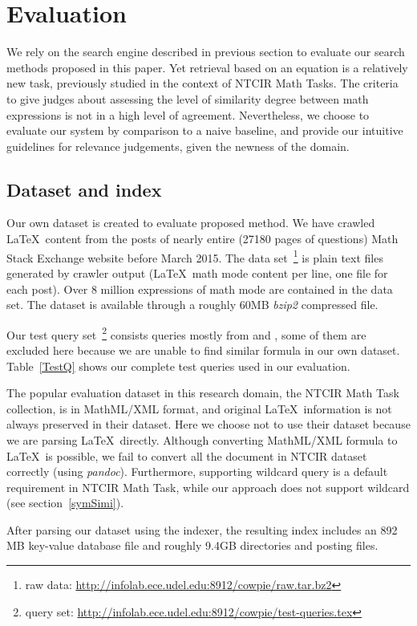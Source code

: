 \section{Evaluation}
We rely on the search engine described in previous section to evaluate our search methods proposed in this paper.
Yet retrieval based on an equation is a relatively new task, previously studied in the context of NTCIR Math Tasks. 
The criteria to give judges about assessing the level of similarity degree between math expressions is not in a high level of agreement.
Nevertheless, we choose to evaluate our system by comparison to a naive baseline, and provide our intuitive guidelines for relevance judgements, given the newness of the domain.

\subsection{Dataset and index}
\label{datasetAndIndex}
Our own dataset is created to evaluate proposed method.
We have crawled \LaTeX\ content from the posts of nearly entire (27180 pages of questions) Math Stack Exchange website before March 2015. 
The data set~\footnote{raw data: \url{http://infolab.ece.udel.edu:8912/cowpie/raw.tar.bz2} }
is plain text files generated by crawler output (\LaTeX\ math mode content per line, one file for each post).  
Over 8 million expressions of math mode are contained in the data set. 
The dataset is available through a roughly 60MB \textit{bzip2} compressed file.

Our test query set~\footnote{query set: \url{http://infolab.ece.udel.edu:8912/cowpie/test-queries.tex}} 
consists queries mostly from \cite{ntcirtopic} and \cite{symbolpairs15}, some of them are excluded here because we are unable to find similar formula in our own dataset.
Table~\ref{TestQ} shows our complete test queries used in our evaluation. 

The popular evaluation dataset in this research domain, the NTCIR Math Task collection, is in MathML/XML format, and original \LaTeX\ information is not always preserved in their dataset. 
Here we choose not to use their dataset because we are parsing \LaTeX\ directly.
Although converting MathML/XML formula to \LaTeX\ is possible, we fail to convert all the document in NTCIR dataset correctly (using \textit{pandoc}).
Furthermore, supporting wildcard query is a default requirement in NTCIR Math Task, while our approach does not support wildcard (see section~\ref{symSimi}).

After parsing our dataset using the indexer, the resulting index includes an 892 MB key-value database file and roughly 9.4GB directories and posting files.

